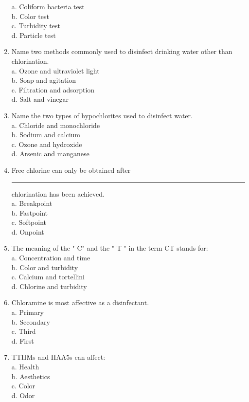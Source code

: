 \begin{enumerate}[1.]
a. Coliform bacteria test\\
b. Color test\\
c. Turbidity test\\
d. Particle test\\
\item Name two methods commonly used to disinfect drinking water other than chlorination.\\
a. Ozone and ultraviolet light\\
b. Soap and agitation\\
c. Filtration and adsorption\\
d. Salt and vinegar\\
\item Name the two types of hypochlorites used to disinfect water.\\
a. Chloride and monochloride\\
b. Sodium and calcium\\
c. Ozone and hydroxide\\
d. Arsenic and manganese\\
\item Free chlorine can only be obtained after \rule{1.5cm}{0.5pt} chlorination has been achieved.\\
a. Breakpoint\\
b. Fastpoint\\
c. Softpoint\\
d. Onpoint\\
\item The meaning of the " C" and the " T " in the term CT stands for:\\
a. Concentration and time\\
b. Color and turbidity\\
c. Calcium and tortellini\\
d. Chlorine and turbidity\\
\item Chloramine is most affective as a disinfectant.\\
a. Primary\\
b. Secondary\\
c. Third\\
d. First\\
\item TTHMs and HAA5s can affect:\\
a. Health\\
b. Aesthetics\\
c. Color\\
d. Odor\\


\end{enumerate}
